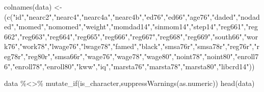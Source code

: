 \documentclass[
]{article}
\newenvironment{Shaded}{\begin{snugshade}}{\end{snugshade}}
\newcommand{\FunctionTok}[1]{\textcolor[rgb]{0.00,0.00,0.00}{#1}}
\newcommand{\NormalTok}[1]{#1}
\newcommand{\OtherTok}[1]{\textcolor[rgb]{0.56,0.35,0.01}{#1}}
\newcommand{\SpecialCharTok}[1]{\textcolor[rgb]{0.00,0.00,0.00}{#1}}
\newcommand{\StringTok}[1]{\textcolor[rgb]{0.31,0.60,0.02}{#1}}
\begin{document}
\begin{Shaded}
\begin{Highlighting}[]
\FunctionTok{colnames}\NormalTok{(data) }\OtherTok{\textless{}{-}}\NormalTok{(}\FunctionTok{c}\NormalTok{(}\StringTok{"id"}\NormalTok{,}\StringTok{"nearc2"}\NormalTok{,}\StringTok{"nearc4"}\NormalTok{,}\StringTok{"nearc4a"}\NormalTok{,}\StringTok{"nearc4b"}\NormalTok{,}\StringTok{"ed76"}\NormalTok{,}\StringTok{"ed66"}\NormalTok{,}\StringTok{"age76"}\NormalTok{,}\StringTok{"daded"}\NormalTok{,}\StringTok{"nodaded"}\NormalTok{,}\StringTok{"momed"}\NormalTok{,}\StringTok{"nomomed"}\NormalTok{,}\StringTok{"weight"}\NormalTok{,}\StringTok{"momdad14"}\NormalTok{,}\StringTok{"sinmom14"}\NormalTok{,}\StringTok{"step14"}\NormalTok{,}\StringTok{"reg661"}\NormalTok{,}\StringTok{"reg662"}\NormalTok{,}\StringTok{"reg663"}\NormalTok{,}\StringTok{"reg664"}\NormalTok{,}\StringTok{"reg665"}\NormalTok{,}\StringTok{"reg666"}\NormalTok{,}\StringTok{"reg667"}\NormalTok{,}\StringTok{"reg668"}\NormalTok{,}\StringTok{"reg669"}\NormalTok{,}\StringTok{"south66"}\NormalTok{,}\StringTok{"work76"}\NormalTok{,}\StringTok{"work78"}\NormalTok{,}\StringTok{"lwage76"}\NormalTok{,}\StringTok{"lwage78"}\NormalTok{,}\StringTok{"famed"}\NormalTok{,}\StringTok{"black"}\NormalTok{,}\StringTok{"smsa76r"}\NormalTok{,}\StringTok{"smsa78r"}\NormalTok{,}\StringTok{"reg76r"}\NormalTok{,}\StringTok{"reg78r"}\NormalTok{,}\StringTok{"reg80r"}\NormalTok{,}\StringTok{"smsa66r"}\NormalTok{,}\StringTok{"wage76"}\NormalTok{,}\StringTok{"wage78"}\NormalTok{,}\StringTok{"wage80"}\NormalTok{,}\StringTok{"noint78"}\NormalTok{,}\StringTok{"noint80"}\NormalTok{,}\StringTok{"enroll76"}\NormalTok{,}\StringTok{"enroll78"}\NormalTok{,}\StringTok{"enroll80"}\NormalTok{,}\StringTok{"kww"}\NormalTok{,}\StringTok{"iq"}\NormalTok{,}\StringTok{"marsta76"}\NormalTok{,}\StringTok{"marsta78"}\NormalTok{,}\StringTok{"marsta80"}\NormalTok{,}\StringTok{"libcrd14"}\NormalTok{))}

\NormalTok{data }\SpecialCharTok{\%\textless{}\textgreater{}\%} \FunctionTok{mutate\_if}\NormalTok{(is\_character,}\FunctionTok{suppressWarnings}\NormalTok{(as.numeric))}
\FunctionTok{head}\NormalTok{(data)}
\end{Highlighting}
\end{Shaded}
\end{document}
